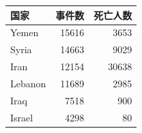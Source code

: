 \begin{tabular}{lrr}
\toprule
国家 & 事件数 & 死亡人数 \\
\midrule
Yemen & 15616 & 3653 \\
Syria & 14663 & 9029 \\
Iran & 12154 & 30638 \\
Lebanon & 11689 & 2985 \\
Iraq & 7518 & 900 \\
Israel & 4298 & 80 \\
\bottomrule
\end{tabular}
